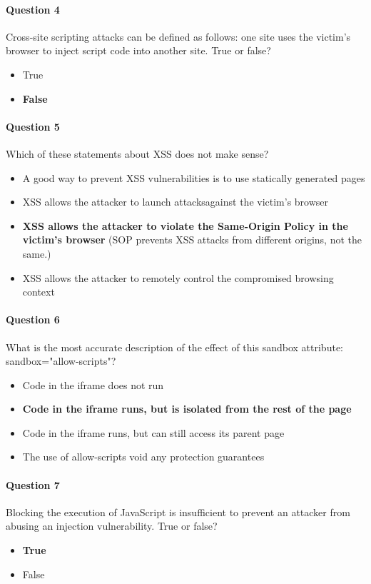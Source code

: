 \documentclass[titlepage]{article}
\begin{document}
    \paragraph{Question 4} Cross-site scripting attacks can be defined as follows: one site uses the victim's browser to inject script code into another site. True or false?
    \begin{itemize}
        \item True
        \item \textbf{False} \checkmark
    \end{itemize}
    \paragraph{Question 5} Which of these statements about XSS does not make sense?
    \begin{itemize}
        \item A good way to prevent XSS vulnerabilities is to use statically generated pages
        \item XSS allows the attacker to launch attacksagainst the victim's browser
        \item \textbf{XSS allows the attacker to violate the Same-Origin Policy in the victim's browser} \checkmark (SOP prevents XSS attacks from different origins, not the same.)
        \item XSS allows the attacker to remotely control the compromised browsing context
    \end{itemize}
    \paragraph{Question 6} What is the most accurate description of the effect of this sandbox attribute: sandbox="allow-scripts"?
    \begin{itemize}
        \item Code in the iframe does not run
        \item \textbf{Code in the iframe runs, but is isolated from the rest of the page} \checkmark
        \item Code in the iframe runs, but can still access its parent page
        \item The use of allow-scripts void any protection guarantees
    \end{itemize}
    \paragraph{Question 7} Blocking the execution of JavaScript is insufficient to prevent an attacker from abusing an injection vulnerability. True or false?
    \begin{itemize}
        \item \textbf{True} \checkmark
        \item False
    \end{itemize}
\end{document}
